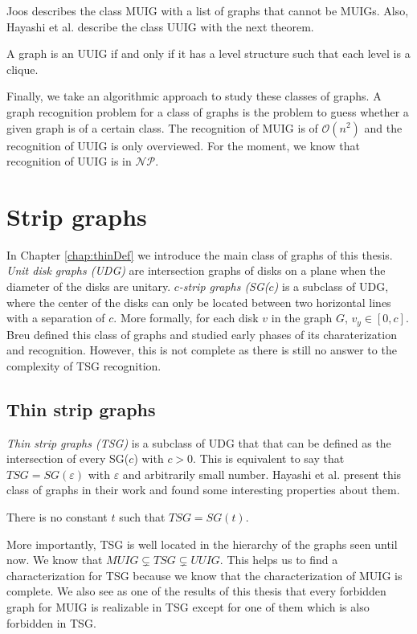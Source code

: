Joos describes the class MUIG \cite{joosCharacterizationMixedUnit2013} with a list of graphs that cannot be MUIGs. Also, Hayashi et al. describe the class UUIG with the next theorem.

\begin{_theo}
  A graph is an UUIG if and only if it has a level structure such that each level is a clique.
\end{_theo}

Finally, we take an algorithmic approach to study these classes of graphs. A graph recognition problem for a class of graphs is the problem to guess whether a given graph is of a certain class. The recognition of MUIG is of $\mathcal{O}(n^2)$ \cite{talonCompletionMixedUnit2014} and the recognition of UUIG is only overviewed. For the moment, we know that recognition of UUIG is in $\mathcal{NP}$.

\section*{Strip graphs}

In Chapter \ref{chap:thinDef} we introduce the main class of graphs of this thesis. \emph{Unit disk graphs (UDG)} are intersection graphs of disks on a plane when the diameter of the disks are unitary. \emph{$c$-strip graphs (SG($c$)} \cite{breuAlgorithmicAspectsConstrained1996} is a subclass of UDG, where the center of the disks can only be located between two horizontal lines with a separation of $c$. More formally, for each disk $v$ in the graph $G$, $v_y \in [0,c]$. Breu \cite{breuAlgorithmicAspectsConstrained1996} defined this class of graphs and studied early phases of its charaterization and recognition. However, this is not complete as there is still no answer to the complexity of TSG recognition.


\subsection*{Thin strip graphs}

\emph{Thin strip graphs (TSG)} is a subclass of UDG that that can be defined as the intersection of every SG($c$) with $c > 0$. This is equivalent to say that $TSG = SG(\varepsilon)$ with $\varepsilon$ and arbitrarily small number. Hayashi et al. \cite{hayashiThinStripGraphs2017} present this class of graphs in their work and found some interesting properties about them.

\begin{_theo}
  There is no constant $t$ such that $TSG = SG(t)$.
\end{_theo}

More importantly, TSG is well located in the hierarchy of the graphs seen until now. We know that $MUIG \subsetneq TSG \subsetneq UUIG$. This helps us to find a characterization for TSG because we know that the characterization of MUIG is complete. We also see as one of the results of this thesis that every forbidden graph for MUIG is realizable in TSG except for one of them which is also forbidden in TSG.

